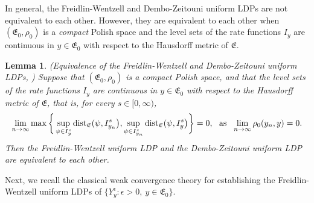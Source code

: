 \documentclass[11pt]{article}
\newcommand{\dist}{{\rm dist}}
\newtheorem{lemma}[theorem]{Lemma}
\numberwithin{equation}{section}
\begin{document}
In general, the Freidlin-Wentzell and  Dembo-Zeitouni uniform LDPs
are not equivalent to each other. However, they are
equivalent to each other when $(\mathfrak{E}_0,\rho_0)$ is a \emph{compact} Polish space and the
level sets of the rate functions $I_y$
are continuous in $y\in\mathfrak{E}_0$ with respect to the Hausdorff metric of  $\mathfrak{E}$.



\begin{lemma}\label{Tattractor1-}
(Equivalence of the Freidlin-Wentzell and  Dembo-Zeitouni uniform LDPs, \cite[Theorem 2.7]{Salins2}) Suppose that $(\mathfrak{E}_0,\rho_0)$ is a compact Polish space, and that the
level sets of the rate functions $I_y$
are continuous in $y\in\mathfrak{E}_0$ with respect to the Hausdorff metric of $\mathfrak{E}$, that is, for every $s\in[0,\infty)$,
$$\lim_{n\rightarrow\infty}\max\bigg\{
\sup_{\psi\in I_y^s}\dist_{\mathfrak{E}}(\psi,I^s_{y_n}\big),
\sup_{\psi\in I_{y_n}^s}\dist_{\mathfrak{E}}(\psi,I^s_{y}\big)    \bigg\}=0,\ \ \mbox{as}\ \ \lim_{n\rightarrow\infty}\rho_0(y_n,y)=0.$$
Then the Freidlin-Wentzell uniform LDP
 and the Dembo-Zeitouni uniform LDP
are equivalent to each other.
\end{lemma}

Next, we recall the classical weak convergence theory for establishing the Freidlin-Wentzell uniform LDPs of $\{Y^\epsilon_y: \epsilon>0,\ y\in\mathfrak{E}_0\}$.
\end{document}
